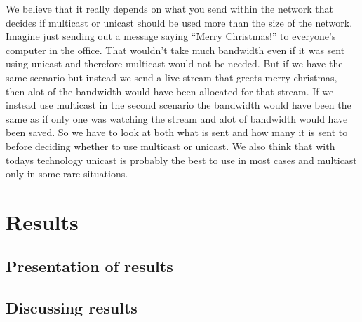 \documentclass[9pt,a4paper]{acmproc}
\begin{document}
We believe that it really depends on what you send within the network that decides if multicast or unicast should be used more than the size of the network. Imagine just sending out a message saying “Merry Christmas!” to everyone’s computer in the office. That wouldn’t take much bandwidth even if it was sent using unicast and therefore multicast would not be needed. But if we have the same scenario but instead we send a live stream that greets merry christmas, then alot of the bandwidth would have been allocated for that stream. If we instead use multicast in the second scenario the bandwidth would have been the same as if only one was watching the stream and alot of bandwidth would have been saved. So we have to look at both what is sent and how many it is sent to before deciding whether to use multicast or unicast. We also think that with todays technology unicast is probably the best to use in most cases and multicast only in some rare situations. \cite{multExplained} \cite{whatIsMult} \cite{understandIpMult} 


\clearpage

\section{Results}

\subsection{Presentation of results}

\subsection{Discussing results}

\clearpage
\end{document}
